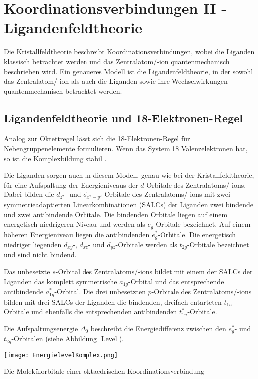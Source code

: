 \section{Koordinationsverbindungen II - Ligandenfeldtheorie}

Die Kristallfeldtheorie beschreibt Koordinationsverbindungen, wobei die Liganden klassisch betrachtet werden und das Zentralatom/-ion quantenmechanisch beschrieben wird. Ein genaueres Modell ist die Ligandenfeldtheorie, in der sowohl das Zentralatom/-ion als auch die Liganden sowie ihre Wechselwirkungen quantenmechanisch betrachtet werden.

\subsection{Ligandenfeldtheorie und 18-Elektronen-Regel}

Analog zur Oktettregel lässt sich die 18-Elektronen-Regel für Nebengruppenelemente formulieren. Wenn das System 18 Valenzelektronen hat, so ist die Komplexbildung stabil \cite{Huheey}.

Die Liganden sorgen auch in diesem Modell, genau wie bei der Kristallfeldtheorie, für eine Aufspaltung der Energieniveaus der $d$-Orbitale des Zentralatoms/-ions. Dabei bilden die $d_{z^2}$- und $d_{x^2-y^2}$-Orbitale des Zentralatoms/-ions mit zwei symmetrieadaptierten Linearkombinationen (SALCs) der Liganden zwei bindende und zwei antibindende Orbitale. Die bindenden Orbitale liegen auf einem energetisch niedrigeren Niveau und werden als $e_g$-Orbitale bezeichnet. Auf einem höheren Energieniveau liegen die antibindenden $e^*_g$-Orbitale. Die energetisch niedriger liegenden $d_{xy}$-, $d_{xz}$- und $d_{yz}$-Orbitale  werden als $t_{2g}$-Orbitale bezeichnet und sind nicht bindend.

Das unbesetzte $s$-Orbital des Zentralatoms/-ions bildet mit einem der SALCs der Liganden das komplett symmetrische $a_{1g}$-Orbital und das entsprechende antibindende $a^*_{1g}$-Orbital. Die drei unbesetzten $p$-Orbitale des Zentralatoms/-ions bilden mit drei SALCs der Liganden die bindenden, dreifach entarteten $t_{1u}$-Orbitale und ebenfalls die entsprechenden antibindenden $t^*_{1u}$-Orbitale.

Die Aufspaltungsenergie $\Delta_0$ beschreibt die Energiedifferenz zwischen den $e^*_g$- und $t_{2g}$-Orbitalen (siehe Abbildung \ref{Level}).

\begin{dsafigure}
	\centering
	\texttt{[image: EnergielevelKomplex.png]}
	\caption{Die Molekülorbitale einer oktaedrischen Koordinationsverbindung \cite{Chemie_der_Metalle}}
	\label{Level}
\end{dsafigure}

